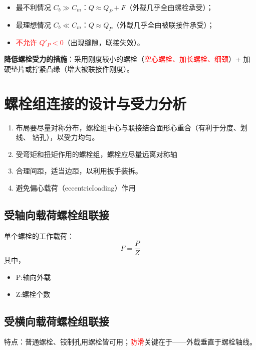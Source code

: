 \begin{note}[$K_c$ 的讨论]
\begin{itemize}
	\item 最不利情况 $C_b\gg C_m$：$Q\approx Q_P+F$（外载几乎全由螺栓承受）；
	\item 最理想情况 $C_b\ll C_m$：$Q\approx Q_P$（外载几乎全由被联接件承受）；
	\item \textcolor{red}{不允许 $Q'_P<0$}（出现缝隙，联接失效）。
\end{itemize}

\textbf{降低螺栓受力的措施}：采用刚度较小的螺栓（\textcolor{red}{空心螺栓、加长螺栓、细颈}）+ 加硬垫片或拧紧凸缘（增大被联接件刚度）。
\end{note}
\section{螺栓组连接的设计与受力分析}
\begin{theorem}[螺栓组的结构设计要求]
    \begin{enumerate}
        \item 布局要尽量对称分布，螺栓组中心与联接结合面形心重合（有利于分度、划线、
钻孔），以受力均匀。
        \item 受弯矩和扭矩作用的螺栓组，螺栓应尽量远离对称轴
        \item 合理间距，适当边距，以利用扳手装拆。
        \item 避免偏心载荷（eccentricIoading）作用


    \end{enumerate}
\end{theorem}
\subsection{受轴向载荷螺栓组联接}
单个螺栓的工作载荷：
\begin{equation}
  F=\frac{P}{Z}
\end{equation}
其中，
\begin{itemize}
    \item P:轴向外载
    \item Z:螺栓个数
\end{itemize}

\subsection{受横向载荷螺栓组联接}
特点：普通螺栓、铰制孔用螺栓皆可用；\textcolor{red}{防滑}关键在于——外载垂直于螺栓轴线。

